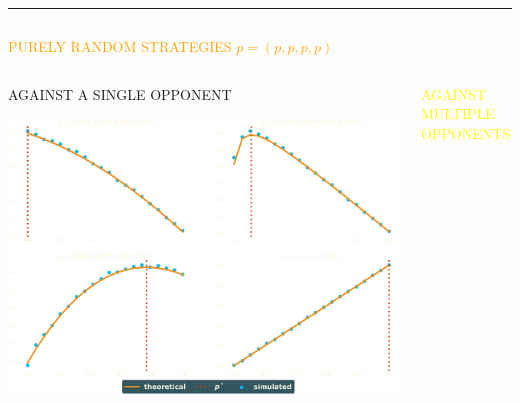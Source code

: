 \documentclass[usenames,dvipsnames,t]{beamer}
\begin{document}
\hrule height 3pt
\vspace{1cm}
\begin{columns}
    \begin{column}{.7\linewidth}
        \begin{center}
            \textcolor{orange}{\Large{PURELY RANDOM STRATEGIES \(p=(p, p, p, p)\)}}
        \end{center}

    \begin{columns}
        \begin{column}{.5\linewidth}
            \begin{center}
            \vspace{-1cm}

            \textcolor{solarizedOrange}{\small{AGAINST A SINGLE OPPONENT}}
            \vspace{2cm}

            
            \vspace{2cm}

            \includegraphics[width=.7\textwidth]{static/matches}
            \end{center}
        \end{column}
        \begin{column}{.5\linewidth}
            \begin{center}
                \vspace{-1cm}
    
                \textcolor{yellow}{\small{AGAINST MULTIPLE OPPONENTS}}
                \vspace{2cm}
    
                
                \vspace{2cm}
    

\end{center}
\end{column}
\end{columns}
\end{column}
\end{columns}
\end{document}
